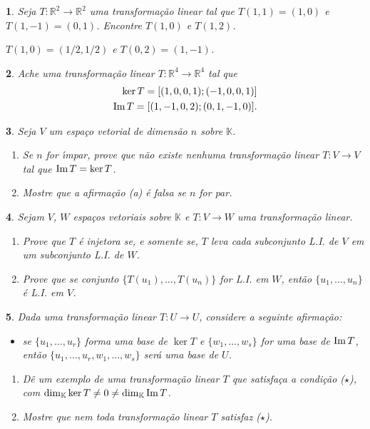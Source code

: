 \documentclass[12pt]{exam}
\newtheorem{exercicio}{}
\newcommand{\im}{{\rm Im\,}}
\newcommand{\real}{\mathbb{R}}
\newcommand{\cp}[1]{\mathbb{#1}}
\begin{document}
\begin{exercicio}
  Seja $T : \real^2 \to \real^2$ uma transforma\c{c}\~ao linear tal que $T(1,1) = (1,0)$ e $T(1,-1) = (0,1)$. Encontre $T(1,0)$ e $T(1,2)$.
  \begin{solucao}
    $T(1,0) = (1/2,1/2)$ e $T(0,2) = (1,-1)$.
  \end{solucao}
\end{exercicio}

\begin{exercicio}
  Ache uma transforma\c{c}\~ao linear $T : \real^4 \to \real^4$ tal que
  \begin{align*}
    \ker T = [(1,0,0,1);(-1,0,0,1)]\\
    \im T = [(1,-1,0,2);(0,1,-1,0)].
  \end{align*}
\end{exercicio}

\begin{exercicio}
  Seja $V$ um espa\c{c}o vetorial de dimens\~ao $n$ sobre $\cp{K}$.
  \begin{enumerate}[label=({\alph*})]
    \item Se $n$ for {\'\i}mpar, prove que n\~ao existe nenhuma transforma\c{c}\~ao linear $T : V \to V$ tal que $\im T = \ker T$.
    \item Mostre que a afirma\c{c}\~ao (a) \'e falsa se $n$ for par.
  \end{enumerate}
\end{exercicio}

\begin{exercicio}
  Sejam $V$, $W$ espa\c{c}os vetoriais sobre $\cp{K}$ e $T : V \to W$ uma transforma\c{c}\~ao linear.
  \begin{enumerate}[label=({\alph*})]
    \item Prove que $T$ \'e injetora se, e somente se, $T$ leva cada subconjunto L.I. de $V$ em um subconjunto L.I. de $W$.
    \item Prove que se  conjunto $\{T(u_1),\dots,T(u_n)\}$ for L.I. em $W$, ent\~ao $\{u_1,\dots,u_n\}$ \'e L.I. em $V$.
  \end{enumerate}
\end{exercicio}

\begin{exercicio}
  Dada uma transforma\c{c}\~ao linear $T : U \to U$, considere a seguinte afirma\c{c}\~ao:
  \begin{itemize}
    \item[($\star$)] se $\{u_1,\dots,u_r\}$ forma uma base de $\ker T$ e $\{w_1,\dots,w_s\}$ for uma base de $\im T$, ent\~ao $\{u_1,\dots,u_r,w_1,\dots,w_s\}$ ser\'a uma base de $U$.
  \end{itemize}
  \begin{enumerate}[label=({\alph*})]
    \item D\^e um exemplo de uma transforma\c{c}\~ao linear $T$ que satisfa\c{c}a a condi\c{c}\~ao ($\star$), com $\dim_\cp{K}\ker T \ne 0 \ne \dim_\cp{K}\im T$.
    \item Mostre que nem toda transforma\c{c}\~ao linear $T$ satisfaz ($\star$).
  \end{enumerate}
\end{exercicio}
\end{document}
